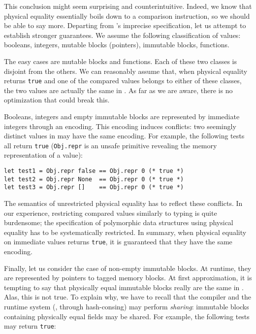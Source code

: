 This conclusion might seem surprising and counterintuitive.
Indeed, we know that physical equality essentially boils down to a comparison instruction, so we should be able to say more.
Departing from \OCaml's imprecise specification, let us attempt to establish stronger guarantees.
We assume the following classification of values: booleans, integers, mutable blocks (pointers), immutable blocks, functions.

The easy cases are mutable blocks and functions.
Each of these two classes is disjoint from the others.
We can reasonably assume that, when physical equality returns \texttt{true} and one of the compared values belongs to either of these classes, the two values are actually the same in \Rocq.
As far as we are aware, there is no optimization that could break this.

Booleans, integers and empty immutable blocks are represented by immediate integers through an encoding.
This encoding induces conflicts: two seemingly distinct values in \Rocq may have the same encoding.
For example, the following tests all return \texttt{true} (\texttt{Obj.repr} is an unsafe primitive revealing the memory representation of a value):

\begin{verbatim}
let test1 = Obj.repr false == Obj.repr 0 (* true *)
let test2 = Obj.repr None  == Obj.repr 0 (* true *)
let test3 = Obj.repr []    == Obj.repr 0 (* true *)
\end{verbatim}

The semantics of unrestricted physical equality has to reflect these conflicts.
In our experience, restricting compared values similarly to typing is quite burdensome; the specification of polymorphic data structures using physical equality has to be systematically restricted.
In summary, when physical equality on immediate values returns \texttt{true}, it is guaranteed that they have the same encoding.

Finally, let us consider the case of non-empty immutable blocks.
At runtime, they are represented by pointers to tagged memory blocks.
At first approximation, it is tempting to say that physically equal immutable blocks really are the same in \Rocq.
Alas, this is not true.
To explain why, we have to recall that the \OCaml compiler and the runtime system (\eg, through hash-consing) may perform \emph{sharing}: immutable blocks containing physically equal fields may be shared.
For example, the following tests may return \texttt{true}:

